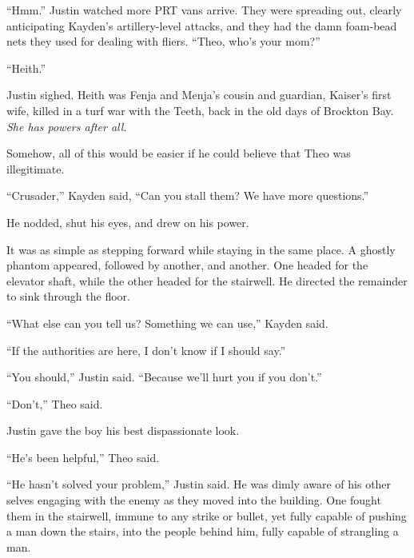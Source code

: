 ``Hmm.''  Justin watched more PRT vans arrive.  They were spreading out, clearly anticipating Kayden's artillery-level attacks, and they had the damn foam-bead nets they used for dealing with fliers.  ``Theo, who's your mom?''



``Heith.''



Justin sighed.  Heith was Fenja and Menja's cousin and guardian, Kaiser's first wife, killed in a turf war with the Teeth, back in the old days of Brockton Bay.\emph{  }\emph{She has powers after all.}



Somehow, all of this would be easier if he could believe that Theo was illegitimate.



``Crusader,'' Kayden said, ``Can you stall them?  We have more questions.''



He nodded, shut his eyes, and drew on his power.



It was as simple as stepping forward while staying in the same place.  A ghostly phantom appeared, followed by another, and another.  One headed for the elevator shaft, while the other headed for the stairwell.  He directed the remainder to sink through the floor.



``What else can you tell us?  Something we can use,'' Kayden said.



``If the authorities are here, I don't know if I should say.''



``You should,'' Justin said.  ``Because we'll hurt you if you don't.''



``Don't,'' Theo said.



Justin gave the boy his best dispassionate look.



``He's been helpful,'' Theo said.



``He hasn't solved your problem,'' Justin said.  He was dimly aware of his other selves engaging with the enemy as they moved into the building.  One fought them in the stairwell, immune to any strike or bullet, yet fully capable of pushing a man down the stairs, into the people behind him, fully capable of strangling a man.



